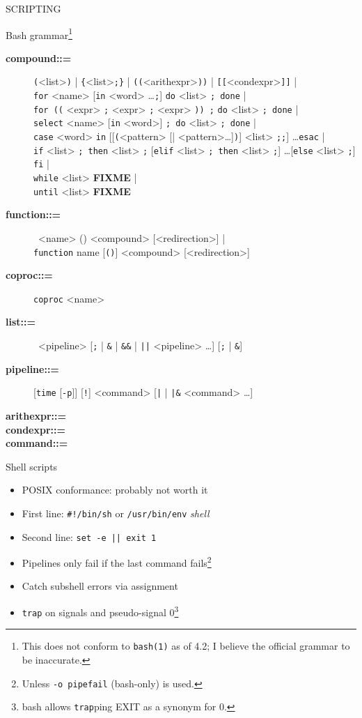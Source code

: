 \documentclass[mathserif,xcolor={dvipsnames,table}]{beamer}
\begin{document}
\begin{frame}
\huge{SCRIPTING}
\end{frame}

\begin{frame}{Bash grammar\footnote{\tiny{This does not conform to {\tt bash(1)} as of 4.2; I believe the official grammar to be inaccurate.}}}
\tiny{
\begin{description}
\item[\textbf{compound::=}] {\tt(}<list>{\tt)} | {\tt\{}<list>{\tt;\}} | {\tt((}<arithexpr>{\tt))} | {\tt[[}<condexpr>{\tt]]} |\\
 {\tt for} <name> [{\tt in} <word> \ldots {\tt;}] {\tt do} <list> {\tt; done} |\\
 {\tt for ((} <expr> {\tt;} <expr> {\tt;} <expr> {\tt)) ;} {\tt do} <list> {\tt; done} |\\
 {\tt select} <name> [{\tt in} <word>] {\tt; do} <list> {\tt; done} |\\
 {\tt case} <word> {\tt in} [[{\tt(}<pattern> [| <pattern>\ldots]{\tt)}] <list> {\tt;;}] \ldots {\tt esac} |\\
 {\tt if} <list> {\tt; then} <list> {\tt;} [{\tt elif} <list> {\tt; then} <list> {\tt;}] \ldots [{\tt else} <list> {\tt;}] {\tt fi} |\\
 {\tt while} <list> \textbf{FIXME} |\\
 {\tt until} <list> \textbf{FIXME}
\item[\textbf{function::=}]\ <name> () <compound> [<redirection>] | \\
 {\tt function} name [{\tt ()}] <compound> [<redirection>]
\item[\textbf{coproc::=}] {\tt coproc} <name> 
\item[\textbf{list::=}]\ <pipeline> [{\tt;} | {\tt\&} | {\tt\&\&} | {\tt||} <pipeline> \ldots] [{\tt;} | {\tt\&}]
\item[\textbf{pipeline::=}] [{\tt time} [{\tt -p}]] [{\tt!}] <command> [{\tt|} | {\tt|\&} <command> \ldots]
\item[\textbf{arithexpr::=}]
\item[\textbf{condexpr::=}]
\item[\textbf{command::=}]
\end{description}
}
\end{frame}

\begin{frame}{Shell scripts}
\begin{itemize}
\item POSIX conformance: probably not worth it
\item First line: \texttt{\#!/bin/sh} or \texttt{/usr/bin/env} \textit{shell}
\item Second line: \texttt{set -e || exit 1}
\item Pipelines only fail if the last command fails\footnote{Unless \texttt{-o pipefail} (bash-only) is used.}
\item Catch subshell errors via assignment
\item \texttt{trap} on signals and pseudo-signal 0\footnote{bash allows \texttt{trap}ping EXIT as a synonym for 0.}
\end{itemize}
\end{frame}
\end{document}
